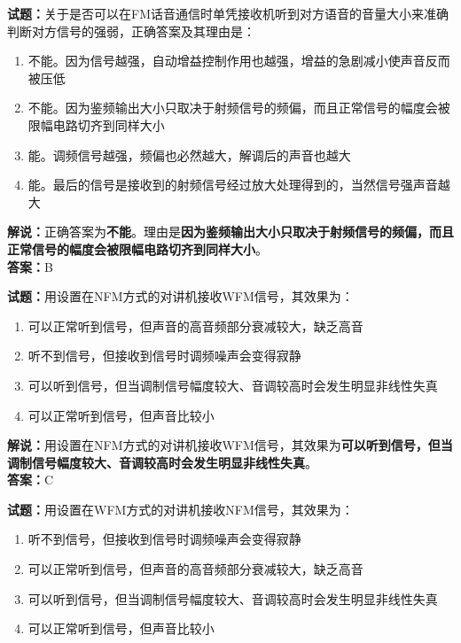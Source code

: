 \documentclass{ctexbook}
\begin{document}
\noindent\textbf{试题：}关于是否可以在FM话音通信时单凭接收机听到对方语音的音量大小来准确判断对方信号的强弱，正确答案及其理由是：

\begin{enumerate}[leftmargin=3em]
	\item 不能。因为信号越强，自动增益控制作用也越强，增益的急剧减小使声音反而被压低
	\item 不能。因为鉴频输出大小只取决于射频信号的频偏，而且正常信号的幅度会被限幅电路切齐到同样大小
	\item 能。调频信号越强，频偏也必然越大，解调后的声音也越大
	\item 能。最后的信号是接收到的射频信号经过放大处理得到的，当然信号强声音越大
\end{enumerate}

\noindent\textbf{解说：}正确答案为\textbf{不能}。理由是\textbf{因为鉴频输出大小只取决于射频信号的频偏，而且正常信号的幅度会被限幅电路切齐到同样大小}。\\\noindent\textbf{答案：}B


\bigskip


\noindent\textbf{试题：}用设置在NFM方式的对讲机接收WFM信号，其效果为：

\begin{enumerate}[leftmargin=3em]
	\item 可以正常听到信号，但声音的高音频部分衰减较大，缺乏高音
	\item 听不到信号，但接收到信号时调频噪声会变得寂静
	\item 可以听到信号，但当调制信号幅度较大、音调较高时会发生明显非线性失真
	\item 可以正常听到信号，但声音比较小
\end{enumerate}

\noindent\textbf{解说：}用设置在NFM方式的对讲机接收WFM信号，其效果为\textbf{可以听到信号，但当调制信号幅度较大、音调较高时会发生明显非线性失真}。\\\noindent\textbf{答案：}C


\bigskip


\noindent\textbf{试题：}用设置在WFM方式的对讲机接收NFM信号，其效果为：

\begin{enumerate}[leftmargin=3em]
	\item 听不到信号，但接收到信号时调频噪声会变得寂静
	\item 可以正常听到信号，但声音的高音频部分衰减较大，缺乏高音
	\item 可以听到信号，但当调制信号幅度较大、音调较高时会发生明显非线性失真
	\item 可以正常听到信号，但声音比较小
\end{enumerate}
\end{document}
